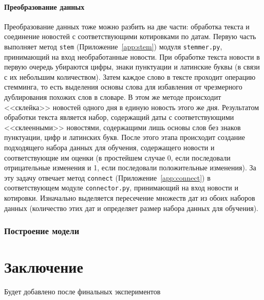 \documentclass[14pt]{matmex-diploma-custom}
\begin{document}
\paragraph{Преобразование данных}

Преобразование данных тоже можно разбить на две части: обработка текста и соединение новостей с соответствующими котировками по датам. Первую часть выполняет метод \texttt{stem} (Приложение~\ref{app:stem}) модуля \texttt{stemmer.py}, принимающий на вход необработанные новости. При обработке текста новости в первую очередь убираются цифры, знаки пунктуации и латинские буквы (в связи с их небольшим количеством). Затем каждое слово в тексте проходит операцию стемминга, то есть выделения основы слова для избавления от чрезмерного дублирования похожих слов в словаре. В этом же методе происходит <<склейка>> новостей одного дня в единую новость этого же дня. Результатом обработки текста является набор, содержащий даты с соответствующими <<склеенными>> новостями, содержащими лишь основы слов без знаков пунктуации, цифр и латинских букв. После этого этапа происходит создание подходящего набора данных для обучения, содержащего новости и соответствующие им оценки (в простейшем случае 0, если последовали отрицательные изменения и 1, если последовали положительные изменения). За эту задачу отвечает метод \texttt{connect} (Приложение~\ref{app:connect}) в соответствующем модуле \texttt{connector.py}, принимающий на вход новости и котировки. Изначально выделяется пересечение множеств дат из обоих наборов данных (количество этих дат и определяет размер набора данных для обучения).



\subsubsection{Построение модели}

\clearpage\section*{Заключение}

Будет добавлено после финальных экспериментов

\setmonofont[Mapping=tex-text]{CMU Typewriter Text}


\end{document}
